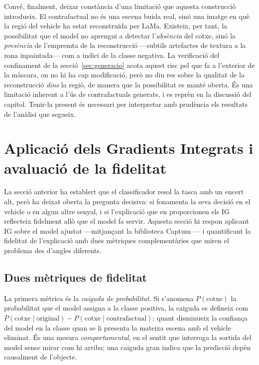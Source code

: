 Convé, finalment, deixar constància d'una limitació que aquesta construcció introdueix. El contrafactual no és una escena buida real, sinó una imatge en què la regió del vehicle ha estat reconstruïda per LaMa. Existeix, per tant, la possibilitat que el model no aprengui a detectar l'\emph{absència} del cotxe, sinó la \emph{presència} de l'empremta de la reconstrucció —subtils artefactes de textura a la zona inpaintada— com a indici de la classe negativa. La verificació del confinament de la secció~\ref{sec:generacio} acota aquest risc pel que fa a l'exterior de la màscara, on no hi ha cap modificació, però no diu res sobre la qualitat de la reconstrucció \emph{dins} la regió, de manera que la possibilitat es manté oberta. És una limitació inherent a l'ús de contrafactuals generats, i es reprèn en la discussió del capítol. Tenir-la present és necessari per interpretar amb prudència els resultats de l'anàlisi que segueix.

\section{Aplicació dels Gradients Integrats i avaluació de la fidelitat} \label{sec:resultats}
La secció anterior ha establert que el classificador resol la tasca amb un encert alt, però ha deixat oberta la pregunta decisiva: si fonamenta la seva decisió en el vehicle o en algun altre senyal, i si l'explicació que en proporcionen els \ac{IG} reflecteix fidelment allò que el model fa servir. Aquesta secció hi respon aplicant \ac{IG} sobre el model ajustat \cite{sundararajan2017} —mitjançant la biblioteca Captum \cite{kokhlikyan2020}— i quantificant la fidelitat de l'explicació amb dues mètriques complementàries que miren el problema des d'angles diferents.

\subsection{Dues mètriques de fidelitat}
La primera mètrica és la \emph{caiguda de probabilitat}. Si s'anomena $P(\text{cotxe})$ la probabilitat que el model assigna a la classe positiva, la caiguda es defineix com $P(\text{cotxe}\mid\text{original}) - P(\text{cotxe}\mid\text{contrafactual})$: quant disminueix la confiança del model en la classe quan se li presenta la mateixa escena amb el vehicle eliminat. És una mesura \emph{comportamental}, en el sentit que interroga la sortida del model sense mirar com hi arriba; una caiguda gran indica que la predicció depèn causalment de l'objecte.

